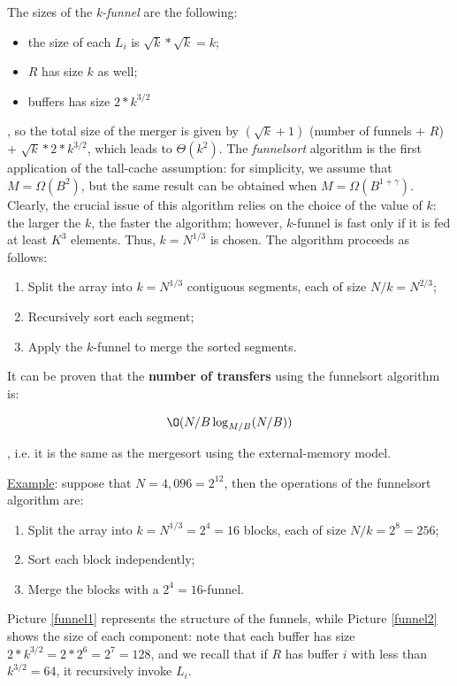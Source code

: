 The sizes of the \textit{k-funnel} are the following:

\begin{itemize}
    \item the size of each $L_i$ is $\sqrt{k} * \sqrt{k} = k$;
    \item $R$ has size $k$ as well;
    \item buffers has size $2 * k^{3/2}$
\end{itemize}

, so the total size of the merger is given by $(\sqrt{k} + 1)$ (number of funnels + $R$) + $\sqrt{k} * 2 * k^{3/2}$, which leads to $\Theta(k^2)$.
The \textit{funnelsort} algorithm is the first application of the tall-cache assumption: for simplicity, we assume that $M = \Omega(B^2)$, but the same result can be obtained when $M = \Omega(B^{1 + \gamma})$. Clearly, the crucial issue of this algorithm relies on the choice of the value of $k$: the larger the $k$, the faster the algorithm; however, $k$-funnel is fast only if it is fed at least $K^3$ elements. Thus, $k = N^{1/3}$ is chosen. The algorithm proceeds as follows:

\begin{enumerate}
    \item Split the array into $k = N^{1/3}$ contiguous segments, each of size $N/k = N^{2/3}$;
    \item Recursively sort each segment;
    \item Apply the $k$-funnel to merge the sorted segments.
\end{enumerate}

It can be proven that the \textbf{number of transfers} using the funnelsort algorithm is:

$$
\O(N/B \log_{M/B}(N/B))
$$

, i.e. it is the same as the mergesort using the external-memory model.

\underline{Example}: suppose that $N = 4,096 = 2^{12}$, then the operations of the funnelsort algorithm are:

\begin{enumerate}
    \item Split the array into $k = N^{1/3} = 2^4 = 16$ blocks, each of size $N/k = 2^8 = 256$;
    \item Sort each block independently;
    \item Merge the blocks with a $2^4 = 16$-funnel.
\end{enumerate}

Picture \ref{funnel1} represents the structure of the funnels, while Picture \ref{funnel2} shows the size of each component: note that each buffer has size $2 * k^{3/2} = 2 * 2^6 = 2^7 = 128$, and we recall that if $R$ has buffer $i$ with less than $k^{3/2} = 64$, it recursively invoke $L_i$.

